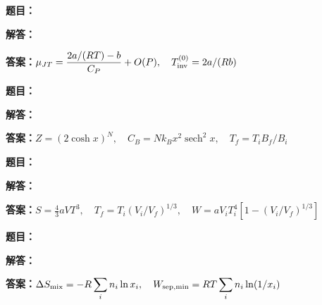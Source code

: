 \documentclass[lang=cn,color=blue,11pt]{elegantbook}
\begin{document}
\par
\noindent\textbf{题目：}
\par\noindent\textbf{解答：}
\par\noindent\textbf{答案：}\(\displaystyle \mu_{JT}=\frac{2a/(RT)-b}{C_P}+O(P),\quad T_{\rm inv}^{(0)}=2a/(Rb)\)\par
\par\smallskip\noindent\hrulefill\par\medskip
{}\par
\noindent\textbf{题目：}
\par\noindent\textbf{解答：}
\par\noindent\textbf{答案：}\(\displaystyle Z=(2\cosh x)^N,\quad C_B=Nk_Bx^2\operatorname{sech}^2x,\quad T_f=T_iB_f/B_i\)\par
\par\smallskip\noindent\hrulefill\par\medskip
{}\par
\noindent\textbf{题目：}
\par\noindent\textbf{解答：}
\par\noindent\textbf{答案：}\(\displaystyle S=\tfrac43aVT^3,\quad T_f=T_i(V_i/V_f)^{1/3},\quad W=aV_iT_i^4[1-(V_i/V_f)^{1/3}]\)\par
\par\smallskip\noindent\hrulefill\par\medskip
{}\par
\noindent\textbf{题目：}
\par\noindent\textbf{解答：}
\par\noindent\textbf{答案：}\(\displaystyle \Delta S_{\rm mix}=-R\sum_i n_i\ln x_i,\quad W_{\rm sep,min}=RT\sum_i n_i\ln(1/x_i)\)\par
\par\smallskip\noindent\hrulefill\par\medskip
\end{document}
